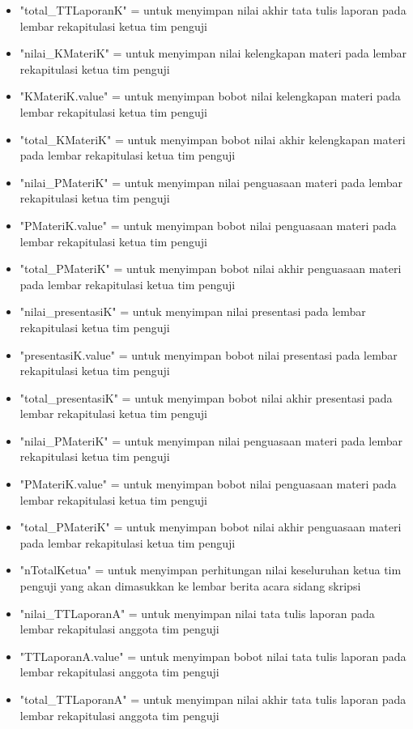 \begin{itemize}
\begin{itemize}
			\item "total\_TTLaporanK" = untuk menyimpan nilai akhir tata tulis laporan pada lembar rekapitulasi ketua tim penguji
			\item "nilai\_KMateriK" = untuk menyimpan nilai kelengkapan materi pada lembar rekapitulasi ketua tim penguji
			\item "KMateriK.value" = untuk menyimpan bobot nilai kelengkapan materi pada lembar rekapitulasi ketua tim penguji
			\item "total\_KMateriK" = untuk menyimpan bobot nilai akhir kelengkapan materi pada lembar rekapitulasi ketua tim penguji
			\item "nilai\_PMateriK" = untuk menyimpan nilai penguasaan materi pada lembar rekapitulasi ketua tim penguji
			\item "PMateriK.value" = untuk menyimpan bobot nilai penguasaan materi pada lembar rekapitulasi ketua tim penguji
			\item "total\_PMateriK" = untuk menyimpan bobot nilai akhir penguasaan materi pada lembar rekapitulasi ketua tim penguji
			\item "nilai\_presentasiK" = untuk menyimpan nilai presentasi pada lembar rekapitulasi ketua tim penguji
			\item "presentasiK.value" = untuk menyimpan bobot nilai presentasi pada lembar rekapitulasi ketua tim penguji
			\item "total\_presentasiK" = untuk menyimpan bobot nilai akhir presentasi pada lembar rekapitulasi ketua tim penguji
			\item "nilai\_PMateriK" = untuk menyimpan nilai penguasaan materi pada lembar rekapitulasi ketua tim penguji
			\item "PMateriK.value" = untuk menyimpan bobot nilai penguasaan materi pada lembar rekapitulasi ketua tim penguji
			\item "total\_PMateriK" = untuk menyimpan bobot nilai akhir penguasaan materi pada lembar rekapitulasi ketua tim penguji
			\item "nTotalKetua" = untuk menyimpan perhitungan nilai keseluruhan ketua tim penguji yang akan dimasukkan ke lembar berita acara sidang skripsi
			\item "nilai\_TTLaporanA" = untuk menyimpan nilai tata tulis laporan pada lembar rekapitulasi anggota tim penguji
			\item "TTLaporanA.value" = untuk menyimpan bobot nilai tata tulis laporan pada lembar rekapitulasi anggota tim penguji
			\item "total\_TTLaporanA" = untuk menyimpan nilai akhir tata tulis laporan pada lembar rekapitulasi anggota tim penguji

\end{itemize}
\end{itemize}
